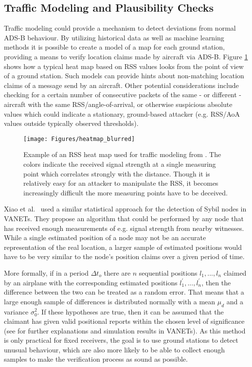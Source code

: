 \documentclass[english]{IEEEtran}
\begin{document}
\subsection{Traffic Modeling and Plausibility Checks \label{sub:Traffic-Modeling-and-Plausibility-Checks}}

Traffic modeling could provide a mechanism to detect deviations from
normal ADS-B behaviour. By utilizing historical data as well as machine
learning methods it is possible to create a model of a map for each
ground station, providing a means to verify location claims made by
aircraft via ADS-B. Figure \ref{fig:Example-heat-map} shows how a
typical heat map based on RSS values looks from the point of view
of a ground station. Such models can provide hints about non-matching
location claims of a message send by an aircraft. Other potential
considerations include checking for a certain number of consecutive
packets of the same - or different - aircraft with the same RSS/angle-of-arrival,
or otherwise suspicious absolute values which could indicate a stationary,
ground-based attacker (e.g. RSS/AoA values outside typically observed
thresholds).

\begin{figure}
\texttt{[image: Figures/heatmap\_blurred]}

\caption{Example of an RSS heat map used for traffic modeling from \cite{schafer2013experimental}.
The colors indicate the received signal strength at a single measuring
point which correlates strongly with the distance. Though it is relatively
easy for an attacker to manipulate the RSS, it becomes increasingly
difficult the more measuring points have to be deceived. \label{fig:Example-heat-map}}


\end{figure}


Xiao et al.~\cite{Xiao} used a similar statistical approach for
the detection of Sybil nodes in VANETs. They propose an algorithm
that could be performed by any node that has received enough measurements
of e.g. signal strength from nearby witnesses. While a single estimated
position of a node may not be an accurate representation of the real
location, a larger sample of estimated positions would have to be
very similar to the node's position claims over a given period of
time. 

More formally, if in a period $\Delta t_{o}$ there are $n$ sequential
positions $l_{1},...,l_{n}$ claimed by an airplane with the corresponding
estimated positions $l_{1}^{'},...,l_{n}^{'}$, then the difference
between the two can be treated as a random error. That means that
a large enough sample of differences is distributed normally with
a mean $\mu_{d}$ and a variance $\sigma_{0}^{2}$. If these hypotheses
are true, then it can be assumed that the claimant has given valid
positional reports within the chosen level of significance (see \cite{Xiao}
for further explanations and simulation results in VANETs). As this
method is only practical for fixed receivers, the goal is to use ground
stations to detect unusual behaviour, which are also more likely to
be able to collect enough samples to make the verification process
as sound as possible.
\end{document}
